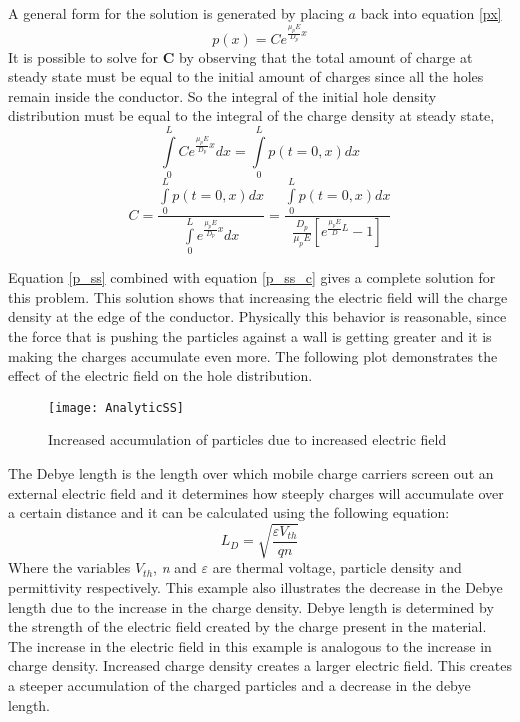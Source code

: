 \begin{doublespace}
A general form for the solution is generated by placing $a$ back into equation \eqref{px} 
\begin{equation}
p(x)=Ce^{\frac{\mu_{p} E}{D_{p}}x}
\label{p_ss}
\end{equation}
It is possible to solve for \textbf{C} by observing that the total amount of charge at steady state must be equal to the initial amount of charges since all the holes remain inside the conductor. So the integral of the initial hole density distribution must be equal to the integral of the charge density at steady state,
\begin{equation}\nonumber
\int\limits_{0}^{L}Ce^{\frac{\mu_{p} E}{D_{p}}x}dx=\int\limits_{0}^{L}p(t=0,x)dx
\end{equation}
\begin{equation}
C=\frac{\int\limits_{0}^{L}p(t=0,x)dx}{\int\limits_{0}^{L}e^{\frac{\mu_{p} E}{D_{p}}x}dx}
=\frac{\int\limits_{0}^{L}p(t=0,x)dx}{\frac{D_p}{\mu_p E}[e^{\frac{\mu_p E}{D} L} -1]}
\label{p_ss_c}
\end{equation}

Equation \ref{p_ss} combined with equation \ref{p_ss_c} gives a complete solution for this problem. This solution shows that increasing the electric field will  the  charge density at the edge of the conductor. Physically this behavior is reasonable, since the force that is pushing the particles against a wall is getting greater and it is making the charges accumulate even more. The following plot demonstrates the effect of the electric field on the hole distribution.
\begin{figure}[!htp]
\centering
\texttt{[image: AnalyticSS]}
\caption{Increased accumulation of particles due to increased electric field} 
\end{figure}

 The Debye length is the length over which mobile charge carriers screen out an external electric field and it determines how steeply charges will accumulate over a certain distance and it can be calculated using the following equation\cite{Dragica1}:
\begin{equation}
L_D=\sqrt{\frac{\varepsilon V_{th}}{q n}}
\end{equation}
Where the variables \textit{$V_{th}$}, \textit{n} and \textit{$\varepsilon$} are thermal voltage, particle density and permittivity respectively. This example also illustrates the decrease in the Debye length due to the increase in the charge density. Debye length is determined by the strength of the electric field created by the charge present in the material. The increase in the electric field in this example is analogous to the increase in charge density. Increased charge density creates a larger electric field. This creates a steeper accumulation of the charged particles and a decrease in the debye length. 



\end{doublespace}
